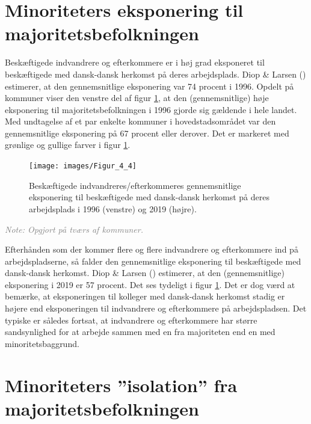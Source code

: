 \documentclass[
]{book}
\begin{document}
\section{Minoriteters eksponering til majoritetsbefolkningen}\label{minoriteters-eksponering-til-majoritetsbefolkningen}

Beskæftigede indvandrere og efterkommere er i høj grad eksponeret til beskæftigede med dansk-dansk herkomst på deres arbejdsplads. Diop \& Larsen () estimerer, at den gennemsnitlige eksponering var 74 procent i 1996. Opdelt på kommuner viser den venstre del af figur \ref{fig:fig-5-5}, at den (gennemsnitlige) høje eksponering til majoritetsbefolkningen i 1996 gjorde sig gældende i hele landet. Med undtagelse af et par enkelte kommuner i hovedstadsområdet var den gennemsnitlige eksponering på 67 procent eller derover. Det er markeret med grønlige og gullige farver i figur \ref{fig:fig-5-5}.

\newpage

\begin{figure}
\texttt{[image: images/Figur\_4\_4]} \caption{Beskæftigede indvandreres/efterkommeres gennemsnitlige eksponering til beskæftigede med dansk-dansk herkomst på deres arbejdsplads i 1996 (venstre) og 2019 (højre).}\label{fig:fig-5-5}
\end{figure}

\begin{footnotesize}\textit{\textcolor{gray}{
Note: Opgjort på tværs af kommuner.
}}
\end{footnotesize}

Efterhånden som der kommer flere og flere indvandrere og efterkommere ind på arbejdspladserne, så falder den gennemsnitlige eksponering til beskæftigede med dansk-dansk herkomst. Diop \& Larsen () estimerer, at den (gennemsnitlige) eksponering i 2019 er 57 procent. Det ses tydeligt i figur \ref{fig:fig-5-5}. Det er dog værd at bemærke, at eksponeringen til kolleger med dansk-dansk herkomst stadig er højere end eksponeringen til indvandrere og efterkommere på arbejdspladsen. Det typiske er således fortsat, at indvandrere og efterkommere har større sandsynlighed for at arbejde sammen med en fra majoriteten end en med minoritetsbaggrund.

\section{Minoriteters ''isolation'' fra majoritetsbefolkningen}\label{minoriteters-isolation-fra-majoritetsbefolkningen}
\end{document}
